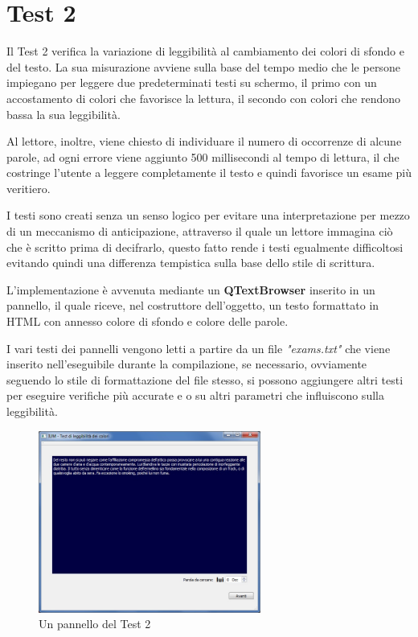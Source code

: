 \documentclass[a4paper]{article}
\begin{document}
\section{Test 2}
Il Test 2 verifica la variazione di leggibilità al cambiamento dei colori di sfondo e del testo.
La sua misurazione avviene sulla base del tempo medio che le persone impiegano per leggere due predeterminati testi su schermo, il primo con un accostamento 
di colori che favorisce la lettura, il secondo con colori che rendono bassa la sua leggibilità.

Al lettore, inoltre, viene chiesto di individuare il numero di occorrenze di alcune parole, ad ogni errore viene aggiunto 500 millisecondi al tempo di lettura,
il che costringe l'utente a leggere completamente il testo e quindi favorisce un esame più veritiero.

I testi sono creati senza un senso logico per evitare una interpretazione per mezzo di un meccanismo di anticipazione, attraverso il quale
un lettore immagina ciò che è scritto prima di decifrarlo, questo fatto rende i testi egualmente difficoltosi 
evitando quindi una differenza tempistica sulla base dello stile di scrittura.

L'implementazione è avvenuta mediante un \textbf{QTextBrowser} inserito in un pannello, il quale riceve, nel costruttore dell'oggetto, 
un testo formattato in HTML con annesso colore di sfondo e colore delle parole.

I vari testi dei pannelli vengono letti a partire da un file \textit{"exams.txt"} che viene inserito nell'eseguibile durante la compilazione, se necessario, 
ovviamente seguendo lo stile di formattazione del file stesso, si possono aggiungere altri testi per eseguire verifiche più accurate e o su
altri parametri che influiscono sulla leggibilità.

\begin{figure}[http]
	\centering
	\includegraphics[width=0.65\textwidth]{dialogo1}
	\caption{Un pannello del Test 2}
	\label{figura:dialogo1}
\end{figure}
\end{document}
